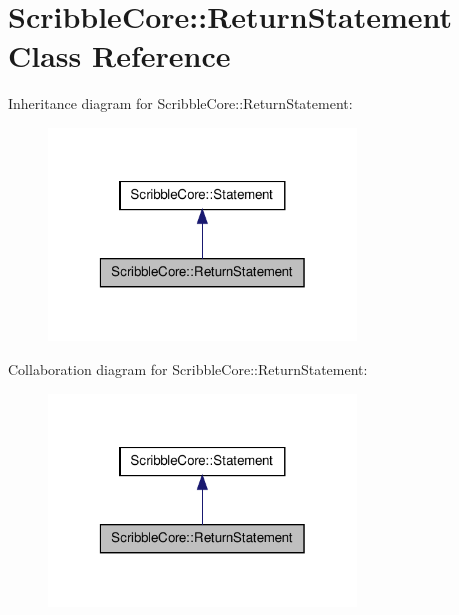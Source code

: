 \hypertarget{class_scribble_core_1_1_return_statement}{\section{Scribble\-Core\-:\-:Return\-Statement Class Reference}
\label{class_scribble_core_1_1_return_statement}
}


Inheritance diagram for Scribble\-Core\-:\-:Return\-Statement\-:
\nopagebreak
\begin{figure}[H]
\begin{center}
\leavevmode
\includegraphics[width=232pt]{class_scribble_core_1_1_return_statement__inherit__graph}
\end{center}
\end{figure}


Collaboration diagram for Scribble\-Core\-:\-:Return\-Statement\-:
\nopagebreak
\begin{figure}[H]
\begin{center}
\leavevmode
\includegraphics[width=232pt]{class_scribble_core_1_1_return_statement__coll__graph}
\end{center}
\end{figure}
